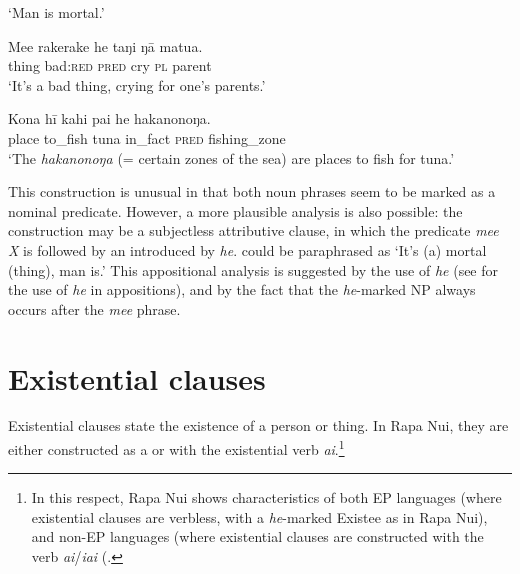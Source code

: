 \glt 
‘Man is mortal.’ \textstyleExampleref{[R210.073]} 
\z

\ea\label{ex:9.57}
\gll Me{\ꞌ}e rakerake he taŋi ŋā matu{\ꞌ}a. \\
thing bad:\textsc{red} \textsc{pred} cry \textsc{pl} parent \\

\glt 
‘It’s a bad thing, crying for one’s parents.’ \textstyleExampleref{[Ley-9-55.073]}
\z

\ea\label{ex:9.58}
\gll Kona hī kahi pa{\ꞌ}i he hakanonoŋa.\\
place to\_fish tuna in\_fact \textsc{pred} fishing\_zone\\

\glt
‘The \textit{hakanonoŋa} (= certain zones of the sea) are places to fish for tuna.’ \textstyleExampleref{[R200.030]} 
\z

This construction is unusual in that both noun phrases seem to be marked as a nominal predicate. However, a more plausible analysis is also possible: the construction may be a subjectless attributive clause, in which the predicate \textit{\mbox{me{\ꞌ}e} X} is followed by an  introduced by \textit{he}.  could be paraphrased as ‘It’s (a) mortal (thing), man is.’ This appositional analysis is suggested by the use of \textit{he} (see  for the use of \textit{he} in appositions), and by the fact that the \textit{he}{}-marked NP always occurs after the \textit{me{\ꞌ}e} phrase. 

\section{Existential clauses}\label{sec:9.3}
Existential clauses state the existence of a person or thing. In Rapa Nui, they are either constructed as a  or with the existential verb \textit{ai}.\footnote{\label{fn:472}In this respect, Rapa Nui shows characteristics of both EP languages (where existential clauses are verbless, with a \textit{he}{}-marked Existee as in Rapa Nui), and non-EP languages (where existential clauses are constructed with the verb \textit{ai}/\textit{iai} (\citealt[101]{Clark1976,Clark1997}.} 

